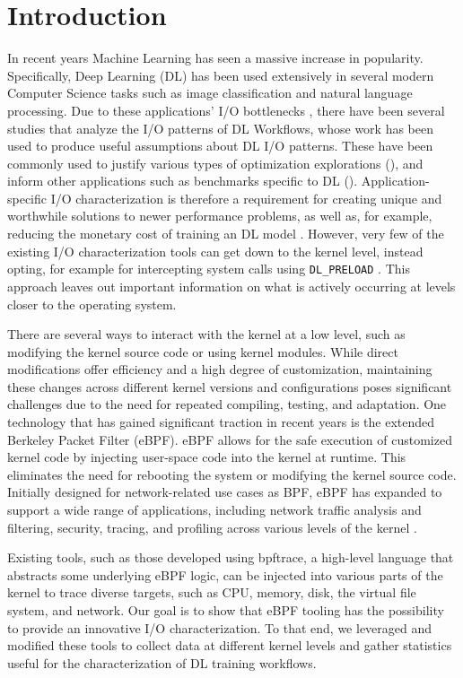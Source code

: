 \documentclass[conference]{IEEEtran}
\begin{document}
\section{Introduction}
In recent years Machine Learning has seen a massive increase in popularity.
Specifically, Deep Learning (DL) has been used extensively in several modern Computer Science tasks such as image classification
and natural language processing.
Due to these applications' I/O bottlenecks \cite{beegfsDL}, there have been several studies that analyze the I/O patterns of DL Workflows, whose work
has been used to produce useful assumptions about DL I/O patterns. These have been commonly used to
justify various types of optimization explorations (\cite{LMDB, nvme, beegfsDL, bamboo}), and inform
other applications such as benchmarks specific to DL (\cite{TFbenchmark,OanaDL}).
Application-specific I/O characterization is therefore a requirement for creating
unique and worthwhile solutions to
newer performance problems, as well as, for example, reducing the monetary cost of training an
DL model \cite{bamboo}. However, very few of the existing I/O characterization tools
can get down to the kernel level, instead opting, for example for intercepting system calls using \texttt{DL\_PRELOAD} \cite{HPCIODarshan}. This approach leaves out important information on what is actively occurring at levels closer to the operating system.

There are several ways to interact with the kernel at a low level, such as modifying the kernel source code or using kernel modules. While direct modifications offer efficiency and a high degree of customization, maintaining these changes across different kernel versions and configurations poses significant challenges due to the need for repeated compiling, testing, and adaptation. One technology that has gained significant traction in recent years is the extended Berkeley Packet Filter (eBPF).
eBPF allows for the safe execution of customized kernel code by injecting user-space code into the kernel at runtime.
This eliminates the need for rebooting the system or modifying the kernel source code.
Initially designed for network-related use cases as BPF, eBPF has expanded to support a wide range of applications, including network traffic analysis and filtering, security, tracing, and profiling across various levels of the kernel \cite{eBPFSurvey2}.

Existing tools, such as those developed using bpftrace, a high-level language that abstracts some underlying eBPF logic, can be injected into various parts of the kernel to trace diverse targets,
such as CPU, memory, disk, the virtual file system, and network.
Our goal is to show that eBPF tooling has the possibility to provide an innovative I/O characterization. To that end, we leveraged and modified these tools to collect data at different kernel levels and gather statistics useful for the characterization of DL training workflows.
\end{document}

